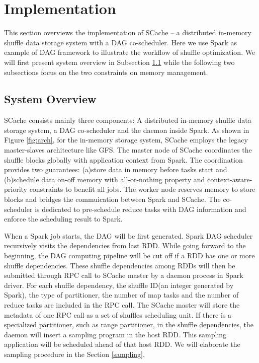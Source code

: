 \section{Implementation}\label{impl}
This section overviews the implementation of SCache -- a distributed in-memory shuffle data storage system with a DAG co-scheduler. Here we use Spark as example of DAG framework to illustrate the workflow of shuffle optimization. We will first present system overview in Subsection \ref{arch} while the following two subsections focus on the two constraints on memory management.

\subsection{System Overview}\label{arch}
SCache consists mainly three components: A distributed in-memory shuffle data storage system, a DAG co-scheduler and the daemon inside Spark. As shown in Figure \ref{fig:arch}, for the in-memory storage system, SCache employs the legacy master-slaves architecture like GFS\cite{gfs}. The master node of SCache coordinates the shuffle blocks globally with application context from Spark. The coordination provides two guarantees: (a)store data in memory before tasks start and (b)schedule data on-off memory with all-or-nothing property and context-aware-priority constraints to benefit all jobs. The worker node reserves memory to store blocks and bridges the commuication between Spark and SCache. The co-scheduler is dedicated to pre-schedule reduce tasks with DAG information and enforce the scheduling result to Spark.

When a Spark job starts, the DAG will be first generated. Spark DAG scheduler recursively visits the dependencies from last RDD. While going forward to the beginning, the DAG computing pipeline will be cut off if a RDD has one or more shuffle dependencies. These shuffle dependencies among RDDs will then be submitted through RPC call to SCache master by a daemon process in Spark driver. For each shuffle dependency, the shuffle ID(an integer generated by Spark), the type of partitioner, the number of map tasks and the number of reduce tasks are included in the RPC call. The SCache master will store the metadata of one RPC call as a set of shuffles scheduling unit. If there is a specialized partitioner, such as range partitioner, in the shuffle dependencies, the daemon will insert a sampling program in the host RDD. This sampling application will be scheduled ahead of that host RDD. We will elaborate the sampling procedure in the Section \ref{sampling}.

